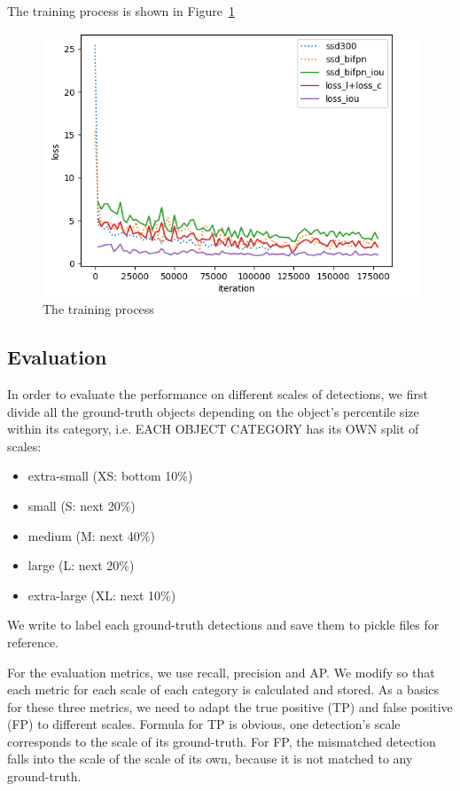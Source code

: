 \documentclass[journal,conference]{IEEEtran}
\begin{document}
The training process is shown in Figure~\ref{fig:train}

\begin{figure}[htbp]
  \centering
  \includegraphics[width=\linewidth]{fig/all.png}
  \caption{The training process}\label{fig:train}
\end{figure}

\subsection{Evaluation}
In order to evaluate the performance on different scales of detections, we first divide all the ground-truth objects depending on the object’s percentile size within its category, i.e. EACH OBJECT CATEGORY has its OWN split of scales:
\begin{itemize}
  \item extra-small (XS: bottom 10\%)
  \item small (S: next 20\%)
  \item medium (M: next 40\%)
  \item large (L: next 20\%)
  \item extra-large (XL: next 10\%)
\end{itemize}

We write  to label each ground-truth detections and save them to pickle files for reference.

For the evaluation metrics, we use recall, precision and AP. We modify  so that each metric for each scale of each category is calculated and stored. As a basics for these three metrics, we need to adapt the true positive (TP) and false positive (FP) to different scales. Formula for TP is obvious, one detection's scale corresponds to the scale of its ground-truth. For FP, the mismatched detection falls into the scale of the scale of its own, because it is not matched to any ground-truth.
\end{document}
